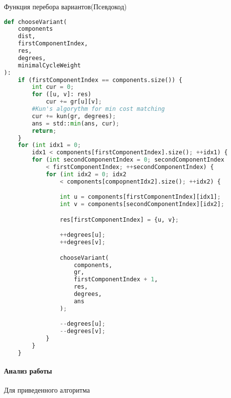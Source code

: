 \begin{algorithm}
\caption{Функция перебора вариантов(Псевдокод)}\label{alg:cap}
\begin{lstlisting}[language=Python, basicstyle=\ttfamily\small)]
def chooseVariant(
    components
    dist, 
    firstComponentIndex, 
    res, 
    degrees, 
    minimalCycleWeight
):
    if (firstComponentIndex == components.size()) {
        int cur = 0;
        for ([u, v]: res)
            cur += gr[u][v];
        #Kun's algorythm for min cost matching
        cur += kun(gr, degrees); 
        ans = std::min(ans, cur);
        return;
    }
    for (int idx1 = 0; 
        idx1 < components[firstComponentIndex].size(); ++idx1) {
        for (int secondComponentIndex = 0; secondComponentIndex 
            < firstComponentIndex; ++secondComponentIndex) {
            for (int idx2 = 0; idx2 
                < components[compopnentIdx2].size(); ++idx2) {

                int u = components[firstComponentIndex][idx1];
                int v = components[secondComponentIndex][idx2];

                res[firstComponentIndex] = {u, v};

                ++degrees[u];
                ++degrees[v];

                chooseVariant(
                    components,
                    gr,
                    firstComponentIndex + 1, 
                    res,
                    degrees, 
                    ans
                );

                --degrees[u];
                --degrees[v];
            }
        }
    }
\end{lstlisting}
\end{algorithm}


\paragraph{Анализ работы}
Для приведенного алгоритма 